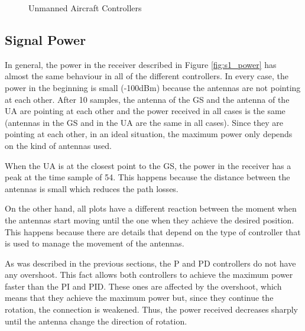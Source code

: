 \begin{figure}[H]
	\hfill
	\hfill
	\caption{Unmanned Aircraft Controllers}
	\label{fig:s1_ua}
\end{figure}

\subsection*{Signal Power}
In general, the power in the receiver described in Figure \ref{fig:s1_power} has almost the same behaviour in all of the different controllers. In every case, the power in the beginning is small (-100dBm) because the antennas are not pointing at each other. After 10 samples, the antenna of the GS and the antenna of the UA are pointing at each other and the power received in all cases is the same (antennas in the GS and in the UA are the same in all cases). Since they are pointing at each other, in an ideal situation, the maximum power only depends on the kind of antennas used.

When the UA is at the closest point to the GS, the power in the receiver has a peak at the time sample of 54. This happens because the distance between the antennas is small which reduces the path losses.

On the other hand, all plots have a different reaction between the moment when the antennas start moving until the one when they achieve the desired position. This happens because there are details that depend on the type of controller that is used to manage the movement of the antennas. 

As was described in the previous sections, the P and PD controllers do not have any overshoot. This fact allows both controllers to achieve the maximum power faster than the PI and PID. These ones are affected by the overshoot, which means that they achieve the maximum power but, since they continue the rotation, the connection is weakened. Thus, the power received decreases sharply until the antenna change the direction of rotation.


